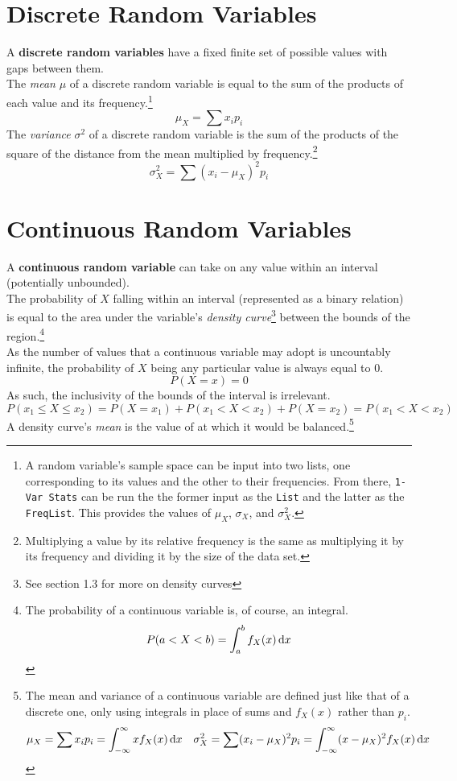 \documentclass[../AP_Statistics.tex]{subfiles}
\begin{document}
		\section{Discrete Random Variables}
			A \textbf{discrete random variables} have a fixed finite set of possible values with gaps between them. \\
			The \emph{mean} $\mu$ of a discrete random variable is equal to the sum of the products of each value and its frequency.\footnote{A random variable's sample space can be input into two lists, one corresponding to its values and the other to their frequencies. From there, \texttt{1-Var Stats} can be run the the former input as the \texttt{List} and the latter as the \texttt{FreqList}. This provides the values of $\mu_X$, $\sigma_X$, and $\sigma_X^2$.}
			\[\mu_X = \sum x_ip_i\]
			The \emph{variance} $\sigma^2$ of a discrete random variable is the sum of the products of the square of the distance from the mean multiplied by frequency.\footnote{Multiplying a value by its relative frequency is the same as multiplying it by its frequency and dividing it by the size of the data set.}
			\[\sigma_X^2 = \sum(x_i - \mu_X)^2p_i\]
		\section{Continuous Random Variables}
			A \textbf{continuous random variable} can take on any value within an interval (potentially unbounded). \\
			The probability of $X$ falling within an interval (represented as a binary relation) is equal to the area under the variable's \emph{density curve}\footnote{See section 1.3 for more on density curves} between the bounds of the region.\footnote{The probability of a continuous variable is, of course, an integral.\[P(a < X < b) = \int_a^bf_X(x)\,\mathrm{d} x\]} \\
			As the number of values that a continuous variable may adopt is uncountably infinite, the probability of $X$ being any particular value is always equal to 0.
			\[P(X = x) = 0\]
			As such, the inclusivity of the bounds of the interval is irrelevant.
			\[P(x_1 \le X \le x_2) = P(X = x_1) + P(x_1 < X < x_2) + P(X = x_2) = P(x_1 < X < x_2)\]
			A density curve's \emph{mean} is the value of at which it would be balanced.\footnote{The mean and variance of a continuous variable are defined just like that of a discrete one, only using integrals in place of sums and $f_X(x)$ rather than $p_i$.\begin{align*}\mu_X = \sum x_ip_i = \int_{-\infty}^\infty xf_X(x)\,\mathrm{d} x && \sigma_X^2 = \sum(x_i - \mu_X)^2p_i = \int_{-\infty}^\infty (x - \mu_X)^2f_X(x)\,\mathrm{d} x \end{align*}} \\
\end{document}
